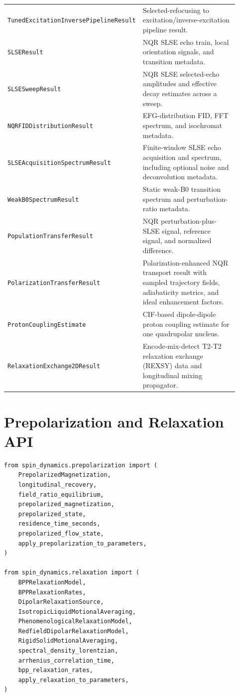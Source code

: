 \documentclass[11pt,oneside]{report}
\newcommand{\code}[1]{\texttt{#1}}
\begin{document}
\begin{longtable}{p{0.43\linewidth}p{0.49\linewidth}}
\code{TunedExcitationInversePipelineResult} & Selected-refocusing to excitation/inverse-excitation pipeline result. \\
\code{SLSEResult} & NQR SLSE echo train, local orientation signals, and transition metadata. \\
\code{SLSESweepResult} & NQR SLSE selected-echo amplitudes and effective decay estimates across a sweep. \\
\code{NQRFIDDistributionResult} & EFG-distribution FID, FFT spectrum, and isochromat metadata. \\
\code{SLSEAcquisitionSpectrumResult} & Finite-window SLSE echo acquisition and spectrum, including optional noise and deconvolution metadata. \\
\code{WeakB0SpectrumResult} & Static weak-B0 transition spectrum and perturbation-ratio metadata. \\
\code{PopulationTransferResult} & NQR perturbation-plus-SLSE signal, reference signal, and normalized difference. \\
\code{PolarizationTransferResult} & Polarization-enhanced NQR transport result with sampled trajectory fields, adiabaticity metrics, and ideal enhancement factors. \\
\code{ProtonCouplingEstimate} & CIF-based dipole-dipole proton coupling estimate for one quadrupolar nucleus. \\
\code{RelaxationExchange2DResult} & Encode-mix-detect T2-T2 relaxation exchange (REXSY) data and longitudinal mixing propagator. \\
\bottomrule
\end{longtable}

\section{Prepolarization and Relaxation API}

\begin{lstlisting}
from spin_dynamics.prepolarization import (
    PrepolarizedMagnetization,
    longitudinal_recovery,
    field_ratio_equilibrium,
    prepolarized_magnetization,
    prepolarized_state,
    residence_time_seconds,
    prepolarized_flow_state,
    apply_prepolarization_to_parameters,
)

from spin_dynamics.relaxation import (
    BPPRelaxationModel,
    BPPRelaxationRates,
    DipolarRelaxationSource,
    IsotropicLiquidMotionalAveraging,
    PhenomenologicalRelaxationModel,
    RedfieldDipolarRelaxationModel,
    RigidSolidMotionalAveraging,
    spectral_density_lorentzian,
    arrhenius_correlation_time,
    bpp_relaxation_rates,
    apply_relaxation_to_parameters,
)
\end{lstlisting}
\end{document}
